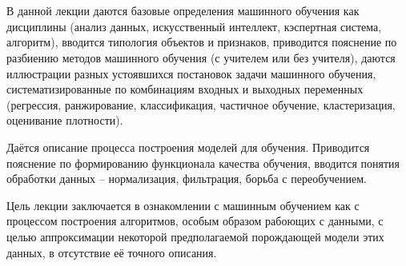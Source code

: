 \chapter{\docname}

В данной лекции даются базовые определения машинного обучения как дисциплины (анализ данных, искусственный интеллект, кэспертная система, алгоритм), вводится типология объектов и признаков, приводится пояснение по разбиению методов машинного обучения (с учителем или без учителя), даются иллюстрации разных устоявшихся постановок задачи машинного обучения, систематизированные по комбинациям входных и выходных переменных (регрессия, ранжирование, классификация, частичное обучение, кластеризация, оценивание плотности).

Даётся описание процесса построения моделей для обучения. Приводится пояснение по формированию функционала качества обучения, вводится понятия обработки данных -- нормализация, фильтрация, борьба с переобучением.

Цель лекции заключается в ознакомлении с машинным обучением как с процессом построения алгоритмов, особым образом рабоющих с данными, с целью аппроксимации некоторой предполагаемой порождающей модели этих данных, в отсутствие её точного описания.
